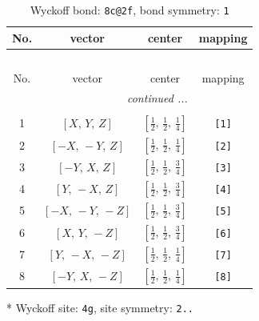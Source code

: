 \documentclass[fleqn,8pt]{jsarticle}
\begin{document}
\begin{longtable}{cccc}
\caption{Wyckoff bond: {\tt 8c@2f}, bond symmetry: {\tt 1}}
 \\
 \hline \hline
No. & vector & center & mapping \\ \hline \endfirsthead

\multicolumn{3}{l}{\tablename\ \thetable{}} \\
 \hline \hline
No. & vector & center & mapping \\ \hline \endhead

 \hline \hline
\multicolumn{3}{r}{\footnotesize\it continued ...} \\ \endfoot

 \hline \hline
\multicolumn{3}{r}{} \\ \endlastfoot

1 & $\left[ X,\, Y,\, Z \right]$ & $\left[ \frac{1}{2},\, \frac{1}{2},\, \frac{1}{4} \right]$ & {\tt [1]} \\ \hline
2 & $\left[ - X,\, - Y,\, Z \right]$ & $\left[ \frac{1}{2},\, \frac{1}{2},\, \frac{1}{4} \right]$ & {\tt [2]} \\ \hline
3 & $\left[ - Y,\, X,\, Z \right]$ & $\left[ \frac{1}{2},\, \frac{1}{2},\, \frac{3}{4} \right]$ & {\tt [3]} \\ \hline
4 & $\left[ Y,\, - X,\, Z \right]$ & $\left[ \frac{1}{2},\, \frac{1}{2},\, \frac{3}{4} \right]$ & {\tt [4]} \\ \hline
5 & $\left[ - X,\, - Y,\, - Z \right]$ & $\left[ \frac{1}{2},\, \frac{1}{2},\, \frac{3}{4} \right]$ & {\tt [5]} \\ \hline
6 & $\left[ X,\, Y,\, - Z \right]$ & $\left[ \frac{1}{2},\, \frac{1}{2},\, \frac{3}{4} \right]$ & {\tt [6]} \\ \hline
7 & $\left[ Y,\, - X,\, - Z \right]$ & $\left[ \frac{1}{2},\, \frac{1}{2},\, \frac{1}{4} \right]$ & {\tt [7]} \\ \hline
8 & $\left[ - Y,\, X,\, - Z \right]$ & $\left[ \frac{1}{2},\, \frac{1}{2},\, \frac{1}{4} \right]$ & {\tt [8]} \\
\end{longtable}
* Wyckoff site: {\tt 4g}, site symmetry: {\tt 2..}
\renewcommand{\arraystretch}{1.2}
\end{document}
